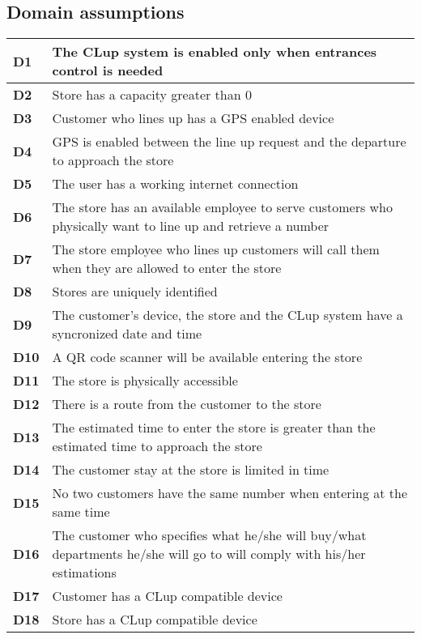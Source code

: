 \subsection{Domain assumptions}

    \begin{center}
        {\renewcommand{\arraystretch}{2}%
        \begin{tabular}{L{2cm}L{12cm}}
            \hline
            \textbf{D1} & The CLup system is enabled only when entrances control is needed \\
            \hline
            \textbf{D2} & Store has a capacity greater than 0 \\
            \hline
            \textbf{D3} & Customer who lines up has a GPS enabled device \\
            \hline
            \textbf{D4} & GPS is enabled between the line up request and the departure to approach the store \\
            \hline
            \textbf{D5} & The user has a working internet connection \\
            \hline
            \textbf{D6} & The store has an available employee to serve customers who physically want to line up and retrieve a number \\
            \hline
            \textbf{D7} & The store employee who lines up customers will call them when they are allowed to enter the store \\
            \hline
            \textbf{D8} & Stores are uniquely identified \\
            \hline
            \textbf{D9} & The customer's device, the store and the CLup system have a syncronized date and time \\
            \hline
            \textbf{D10} & A QR code scanner will be available entering the store \\
            \hline
            \textbf{D11} & The store is physically accessible \\
            \hline
            \textbf{D12} & There is a route from the customer to the store \\
            \hline
            \textbf{D13} & The estimated time to enter the store is greater than the estimated time to approach the store \\
            \hline
            \textbf{D14} & The customer stay at the store is limited in time \\
            \hline
            \textbf{D15} & No two customers have the same number when entering at the same time \\
            \hline
            \textbf{D16} & The customer who specifies what he/she will buy/what departments he/she will go to will comply with his/her estimations \\
            \hline
            \textbf{D17} & Customer has a CLup compatible device \\
            \hline
            \textbf{D18} & Store has a CLup compatible device \\
            \hline
        \end{tabular}}
    \end{center}